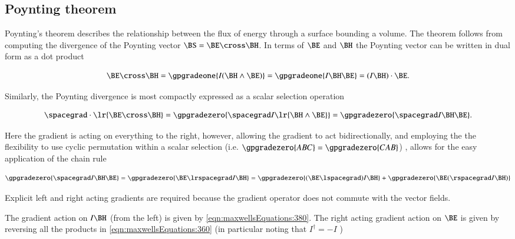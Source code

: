 %
%
\subsection{Poynting theorem}

Poynting's theorem describes the relationship between the flux of energy through a surface bounding a volume.
The theorem follows from computing the divergence of the Poynting vector \( \BS = \BE \cross \BH \).
In terms of \( \BE \) and \( \BH \) the Poynting vector can be written in dual form as a dot product

\begin{equation}\label{eqn:maxwellsEquations:780}
\BE \cross \BH
=
\gpgradeone{ I (\BH \wedge \BE) }
=
\gpgradeone{ I \BH \BE }
=
(I \BH) \cdot \BE.
\end{equation}

Similarly, the Poynting divergence is most compactly expressed as a scalar selection operation

\begin{equation}\label{eqn:maxwellsEquations:640}
\spacegrad \cdot \lr{ \BE \cross \BH }
=
\gpgradezero{ \spacegrad I \lr{ \BH \wedge \BE } }
=
\gpgradezero{ \spacegrad I \BH \BE }.
\end{equation}

Here the gradient is acting on everything to the right, however, allowing the gradient to act bidirectionally, and employing the
the flexibility to use cyclic permutation within a scalar selection
(i.e. \(\gpgradezero{ABC} = \gpgradezero{CAB}\))
, allows for the easy application of the chain rule

\begin{dmath}\label{eqn:maxwellsEquations:760}
\gpgradezero{ \spacegrad I \BH \BE }
=
\gpgradezero{ \BE \lrspacegrad I \BH }
=
\gpgradezero{ (\BE \lspacegrad) I \BH }
+\gpgradezero{ \BE (\rspacegrad I \BH) }
\end{dmath}

Explicit left and right acting gradients are required because the gradient operator does not commute with the vector fields.

The gradient action on \( I \BH \) (from the left) is given by
\cref{eqn:maxwellsEquations:380}.
The right acting gradient action on \( \BE \) is given by reversing all the products in
\cref{eqn:maxwellsEquations:360} (in particular noting that \( I^\dagger = -I \) )

